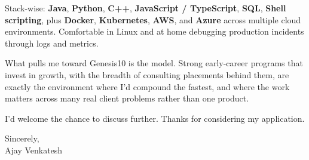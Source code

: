 \documentclass[letterpaper,11pt]{article}
\begin{document}
Stack-wise: \textbf{Java}, \textbf{Python}, \textbf{C++}, \textbf{JavaScript / TypeScript}, \textbf{SQL}, \textbf{Shell scripting}, plus \textbf{Docker}, \textbf{Kubernetes}, \textbf{AWS}, and \textbf{Azure} across multiple cloud environments. Comfortable in Linux and at home debugging production incidents through logs and metrics.

What pulls me toward Genesis10 is the model. Strong early-career programs that invest in growth, with the breadth of consulting placements behind them, are exactly the environment where I'd compound the fastest, and where the work matters across many real client problems rather than one product.

I'd welcome the chance to discuss further. Thanks for considering my application.

\vspace{12pt}
Sincerely, \\
Ajay Venkatesh
\end{document}
